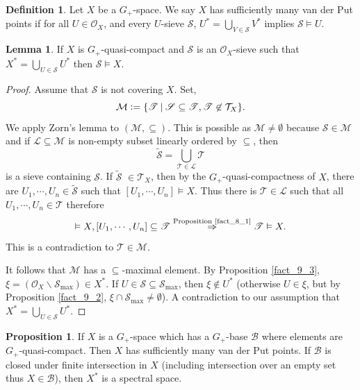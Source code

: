 \documentclass[10pt]{article}
\numberwithin{equation}{section}
\theoremstyle{definition}
\newtheorem{proposition}{Proposition}[subsection]
\newtheorem{definition}{Definition}[subsection]
\newtheorem{lemma}{Lemma}[subsection]
\newcommand{\defeq}{\vcentcolon=}
\newcommand{\Ouv}{\mathscr{O}}
\newcommand{\sep}[0]{\:|\:}
\newcommand{\sS}[0]{\mathscr{S}}
\newcommand{\cB}[0]{\mathcal{B}}
\begin{document}
\begin{definition}
    \label{definition_10_10}
    Let $X$ be a $G_+$-space. We say $X$ has sufficiently many van der Put points if for all $U\in\Ouv_X$, and every $U$-sieve $\sS$, $U^*=\bigcup_{V\in\sS}V^*$ implies $\sS\vDash U$.
\end{definition}

\begin{lemma}
    \label{lemma_10_1}
    If $X$ is $G_+$-quasi-compact and $\sS$ is an $\Ouv_X$-sieve such that $X^*=\bigcup_{U\in\sS}U^*$ then $\sS \vDash X$.
\end{lemma}

\begin{proof}
    Assume that $\sS$ is not covering $X$. Set,
    \begin{equation*}
    \mathcal{M} \defeq\{\mathscr{T}\sep \sS\subseteq\mathscr{T},\mathscr{T}\not\in\mathcal{T}_X\}.
    \end{equation*}
    We apply Zorn's lemma to $(\mathcal{M},\subseteq)$. This is possible as $\mathcal{M}\not=\emptyset$ because $\sS\in\mathcal{M}$ and if $\mathcal{L}\subseteq\mathcal{M}$ is non-empty subset linearly ordered by $\subseteq$, then
    \begin{equation*}
    \widetilde{\sS}=\bigcup_{\mathscr{T}\in\mathcal{L}}\mathscr{T}
    \end{equation*}
    is a sieve containing $\sS$. If $\widetilde{\sS}$ $\in\mathcal{T}_X$, then by the $G_+$-quasi-compactness of $X$, there are $U_1,\cdots,U_n\in\widetilde{\sS}$ such that $[U_1,\cdots,U_n]\vDash X$. Thus there is $\mathscr{T}\in\mathcal{L}$ such that all $U_1,\cdots, U_n\in\mathscr{T}$ therefore
    \begin{equation*}
    [U_1,\cdots,U_n]\vDash X,[U_1,\cdots,U_n]\subseteq\mathscr{T}\stackrel{\text{Proposition \ref{fact_8_1}}}{\Rightarrow}\mathscr{T}\vDash X.
    \end{equation*}
    This is a contradiction to $\mathscr{T}\in\mathcal{M}$.
    \par It follows that $\mathcal{M}$ has a $\subseteq$-maximal element. By Proposition \ref{fact_9_3}, $\xi=(\Ouv_X\backslash\sS_{\max})\in X^*$. If $U\in\sS\subseteq\sS_{\max}$, then $\xi\not\in U^*$ (otherwise $U\in\xi$, but by Proposition \ref{fact_9_2}, $\xi\cap\sS_{\max}\not=\emptyset$). A contradiction to our assumption that $X^*=\bigcup_{U\in\sS}U^*$.
\end{proof}

\begin{proposition}
    If $X$ is a $G_+$-space which has a $G_+$-base $\cB$ where elements are $G_+$-quasi-compact. Then $X$ has sufficiently many van der Put points.
    If $\cB$ is closed under finite intersection in $X$ (including intersection over an empty set thus $X\in\cB$), then $X^*$ is a spectral space.
\end{proposition}
\end{document}
